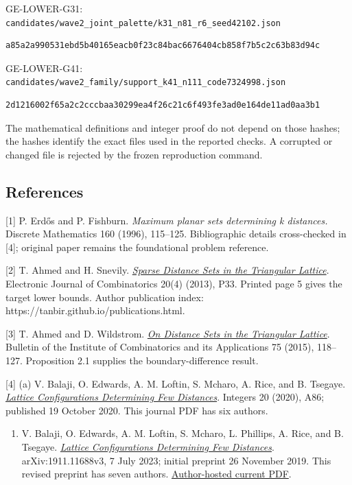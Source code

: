 \documentclass[
]{article}
\providecommand{\tightlist}{%
  \setlength{\itemsep}{0pt}\setlength{\parskip}{0pt}}
\begin{document}
GE-LOWER-G31:
\texttt{candidates/wave2\_joint\_palette/k31\_n81\_r6\_seed42102.json}

\begin{verbatim}
a85a2a990531ebd5b40165eacb0f23c84bac6676404cb858f7b5c2c63b83d94c
\end{verbatim}

GE-LOWER-G41:
\texttt{candidates/wave2\_family/support\_k41\_n111\_code7324998.json}

\begin{verbatim}
2d1216002f65a2c2cccbaa30299ea4f26c21c6f493fe3ad0e164de11ad0aa3b1
\end{verbatim}

The mathematical definitions and integer proof do not depend on those
hashes; the hashes identify the exact files used in the reported checks.
A corrupted or changed file is rejected by the frozen reproduction
command.

\subsection{References}\label{references}

{[}1{]} P. Erdős and P. Fishburn. \emph{Maximum planar sets determining
k distances.} Discrete Mathematics 160 (1996), 115--125. Bibliographic
details cross-checked in {[}4{]}; original paper remains the
foundational problem reference.

{[}2{]} T. Ahmed and H. Snevily.
\href{https://www.combinatorics.org/ojs/index.php/eljc/article/download/v20i4p33/pdf/}{\emph{Sparse
Distance Sets in the Triangular Lattice}}. Electronic Journal of
Combinatorics 20(4) (2013), P33. Printed page 5 gives the target lower
bounds. Author publication index:
https://tanbir.github.io/publications.html.

{[}3{]} T. Ahmed and D. Wildstrom.
\href{https://tanbir.github.io/files/preprints/ahmed_wildstrom_distance_sets.pdf}{\emph{On
Distance Sets in the Triangular Lattice}}. Bulletin of the Institute of
Combinatorics and its Applications 75 (2015), 118--127. Proposition 2.1
supplies the boundary-difference result.

{[}4{]} (a) V. Balaji, O. Edwards, A. M. Loftin, S. Mcharo, A. Rice, and
B. Tsegaye.
\href{https://math.colgate.edu/~integers/u86/u86.pdf}{\emph{Lattice
Configurations Determining Few Distances}}. Integers 20 (2020), A86;
published 19 October 2020. This journal PDF has six authors.

\begin{enumerate}
\def\labelenumi{(\alph{enumi})}
\setcounter{enumi}{1}
\tightlist
\item
  V. Balaji, O. Edwards, A. M. Loftin, S. Mcharo, L. Phillips, A. Rice,
  and B. Tsegaye. \href{https://arxiv.org/abs/1911.11688}{\emph{Lattice
  Configurations Determining Few Distances}}. arXiv:1911.11688v3, 7 July
  2023; initial preprint 26 November 2019. This revised preprint has
  seven authors.
  \href{https://alexricemath.com/wp-content/uploads/2023/07/LatticeDraftRevisedNew.pdf}{Author-hosted
  current PDF}.
\end{enumerate}
\end{document}
